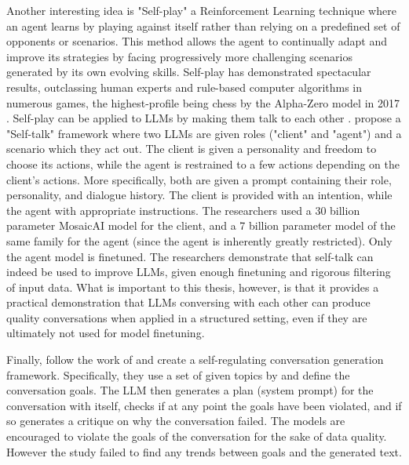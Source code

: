 Another interesting idea is "Self-play" a Reinforcement Learning technique where an agent learns by playing against itself rather than relying on a predefined set of opponents or scenarios. This method allows the agent to continually adapt and improve its strategies by facing progressively more challenging scenarios generated by its own evolving skills. Self-play has demonstrated spectacular results, outclassing human experts and rule-based computer algorithms in numerous games, the highest-profile being chess by the Alpha-Zero model in 2017 \cite{silver2017masteringchessshogiselfplay}. Self-play can be applied to LLMs by making them talk to each other \cite{cheng2024selfplayingadversariallanguagegame}.  \cite{ulmer2024bootstrappingllmbasedtaskorienteddialogue} propose a "Self-talk" framework where two LLMs are given roles ("client" and "agent") and a scenario which they act out. The client is given a personality and freedom to choose its actions, while the agent is restrained to a few actions depending on the client's actions. More specifically, both are given a prompt containing their role, personality, and dialogue history. The client is provided with an intention, while the agent with appropriate instructions. The researchers used a 30 billion parameter MosaicAI \cite{MosaicML2023} model for the client, and a 7 billion parameter model of the same family for the agent (since the agent is inherently greatly restricted). Only the agent model is finetuned. The researchers demonstrate that self-talk can indeed be used to improve LLMs, given enough finetuning and rigorous filtering of input data. What is important to this thesis, however, is that it provides a practical demonstration that LLMs conversing with each other can produce quality conversations when applied in a structured setting, even if they are ultimately not used for model finetuning.


Finally, \cite{lambert2024selfdirectedsyntheticdialoguesrevisions} follow the work of \cite{Bai2022ConstitutionalAH} and create a self-regulating conversation generation framework. Specifically, they use a set of given topics by \cite{Castricato2024SuppressingPE} and define the conversation goals. The LLM then generates a plan (system prompt) for the conversation with itself, checks if at any point the goals have been violated, and if so generates a critique on why the conversation failed. The models are encouraged to violate the goals of the conversation for the sake of data quality. However the study failed to find any trends between goals and the generated text.


